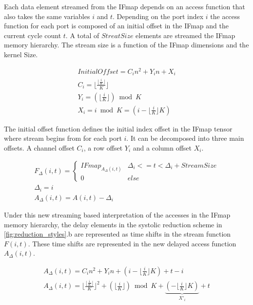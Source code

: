 Each data element streamed from the IFmap depends on an access function that
also takes the same variables $i$ and $t$. Depending on the port index $i$ the
access function for each port is composed of an initial offset in the IFmap and
the current cycle count $t$. A total of $StreatSize$ elements are streamed the IFmap
memory hierarchy. The stream size is a function of the IFmap dimensions
and the kernel Size. 

\begin{gather}
    InitialOffset = C_in^2+Y_in+X_i \\
    C_i = \lfloor \frac{\lfloor \frac{i}{K} \rfloor}{K} \rfloor \\
    Y_i = (\lfloor \frac{i}{K} \rfloor ) \bmod K\\
    X_i = i \bmod K = (i - \lfloor \frac{i}{K} \rfloor K)
\end{gather}

The initial offset function defines the initial index
offset in the IFmap tensor where stream begins from for each port $i$. It can be
decomposed into three main offsets. A channel offset $C_i$, a row offset $Y_i$
and a column offset $X_i$. 

\begin{gather}
    F_\Delta(i, t) = \begin{cases}
    IFmap_{A_\Delta(i, t)} & \Delta_i<=t < \Delta_i+ StreamSize \\
    0 & else
    \end{cases} \\
    \Delta_i = i \\
    A_\Delta(i,t) = A(i, t) - \Delta_i
\end{gather}

Under this new streaming based interpretation of the accesses in the IFmap
memory hierarchy, the delay elements in the systolic reduction scheme in
\autoref{fig:reduction_styles}.b are represented as time shifts in the stream
function $F(i,t)$. These time shifts are represented in the new delayed access
function $A_\Delta(i, t)$.

\begin{gather}
    A_\Delta(i,t) =  C_in^2+Y_in+(i - \lfloor \frac{i}{K} \rfloor K) + t- i\\
    A_\Delta(i,t) =  \lfloor \frac{\lfloor \frac{i}{K} \rfloor}{K} \rfloor^2+(\lfloor \frac{i}{K} \rfloor ) \bmod K + \underbrace{(- \lfloor \frac{i}{K} \rfloor K)}_{X'_i} + t\\
\end{gather}

